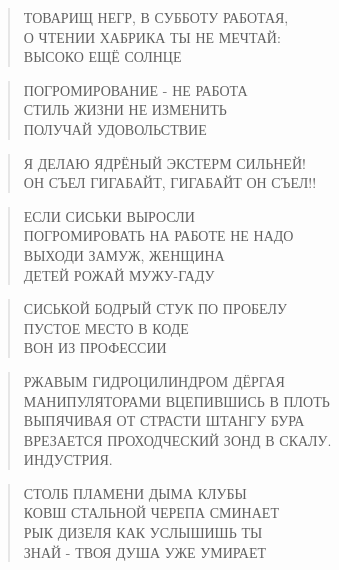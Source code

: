 \poemtitle{***}
\begin{verse}
ТОВАРИЩ НЕГР, В СУББОТУ РАБОТАЯ,\\
О ЧТЕНИИ ХАБРИКА ТЫ НЕ МЕЧТАЙ:\\
ВЫСОКО ЕЩЁ СОЛНЦЕ
\end{verse}

\poemtitle{***}
\begin{verse}
ПОГРОМИРОВАНИЕ - НЕ РАБОТА\\
СТИЛЬ ЖИЗНИ НЕ ИЗМЕНИТЬ\\
ПОЛУЧАЙ УДОВОЛЬСТВИЕ
\end{verse}

\poemtitle{***}
\begin{verse}
Я ДЕЛАЮ ЯДРЁНЫЙ ЭКСТЕРМ СИЛЬНЕЙ!\\
ОН СЪЕЛ ГИГАБАЙТ, ГИГАБАЙТ ОН СЪЕЛ!!
\end{verse}

\poemtitle{***}
\begin{verse}
ЕСЛИ СИСЬКИ ВЫРОСЛИ\\
ПОГРОМИРОВАТЬ НА РАБОТЕ НЕ НАДО\\
ВЫХОДИ ЗАМУЖ, ЖЕНЩИНА\\
ДЕТЕЙ РОЖАЙ МУЖУ-ГАДУ
\end{verse}

\poemtitle{***}
\begin{verse}
СИСЬКОЙ БОДРЫЙ СТУК ПО ПРОБЕЛУ\\
ПУСТОЕ МЕСТО В КОДЕ\\
ВОН ИЗ ПРОФЕССИИ
\end{verse}

\poemtitle{***}
\begin{verse}
РЖАВЫМ ГИДРОЦИЛИНДРОМ ДЁРГАЯ\\
МАНИПУЛЯТОРАМИ ВЦЕПИВШИСЬ В ПЛОТЬ\\
ВЫПЯЧИВАЯ ОТ СТРАСТИ ШТАНГУ БУРА\\
ВРЕЗАЕТСЯ ПРОХОДЧЕСКИЙ ЗОНД В СКАЛУ.\\
ИНДУСТРИЯ.
\end{verse}

\poemtitle{***}
\begin{verse}
СТОЛБ ПЛАМЕНИ ДЫМА КЛУБЫ\\
КОВШ СТАЛЬНОЙ ЧЕРЕПА СМИНАЕТ\\
РЫК ДИЗЕЛЯ КАК УСЛЫШИШЬ ТЫ\\
ЗНАЙ - ТВОЯ ДУША УЖЕ УМИРАЕТ
\end{verse}

